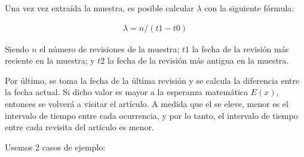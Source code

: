 Una vez vez extraída la muestra, es posible calcular $\lambda$ con la siguiente fórmula:

\begin{gather*}
\lambda = n / (t1 - t0)
\end{gather*}

Siendo $n$ el número de revisiones de la muestra;
$t1$ la fecha de la revisión más reciente en la muestra;
y $t2$ la fecha de la revisión más antigua en la muestra.

Por último, se toma la fecha de la última revisión y se calcula la diferencia entre la fecha actual.
Si dicho valor es mayor a la esperanza matemática $E(x)$, entonces se volverá a visitar el artículo.
A medida que el  se eleve, menor es el intervalo de tiempo entre cada ocurrencia, y por lo tanto, el intervalo de tiempo entre cada revisita del artículo es menor.

Usemos 2 casos de ejemplo:

